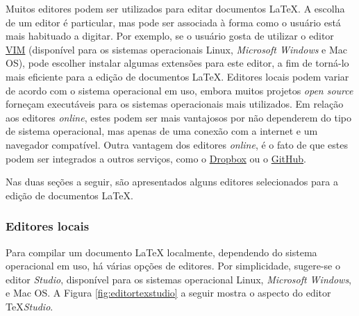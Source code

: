 Muitos editores podem ser utilizados para editar documentos \LaTeX{}. A escolha de um editor é particular, mas pode ser associada à forma como o usuário está mais habituado a digitar. Por exemplo, se o usuário gosta de utilizar o editor \href{https://www.vim.org}{VIM} (disponível para os sistemas operacionais Linux, \textit{Microsoft Windows} e Mac OS), pode escolher instalar algumas extensões para este editor, a fim de torná-lo mais eficiente para a edição de documentos \LaTeX{}. Editores locais podem variar de acordo com o sistema operacional em uso, embora muitos projetos \textit{open source} forneçam executáveis para os sistemas operacionais mais utilizados. Em relação aos editores \textit{online}, estes podem ser mais vantajosos por não dependerem do tipo de sistema operacional, mas apenas de uma conexão com a internet e um navegador compatível. Outra vantagem dos editores \textit{online}, é o fato de que estes podem ser integrados a outros serviços, como o \href{https://dropbox.com}{Dropbox} ou o \href{https://github.com}{GitHub}.

Nas duas seções a seguir, são apresentados alguns editores selecionados para a edição de documentos \LaTeX{}.

\subsubsection*{Editores locais}
\label{sec:ed_local}

Para compilar um documento \LaTeX{} localmente, dependendo do sistema operacional em uso, há várias opções de editores. Por simplicidade, sugere-se o editor \Tex\textit{Studio}, disponível para os sistemas operacional Linux, \textit{Microsoft Windows}, e Mac OS. A Figura \ref{fig:editortexstudio} a seguir mostra o aspecto do editor \TeX\textit{Studio}.

